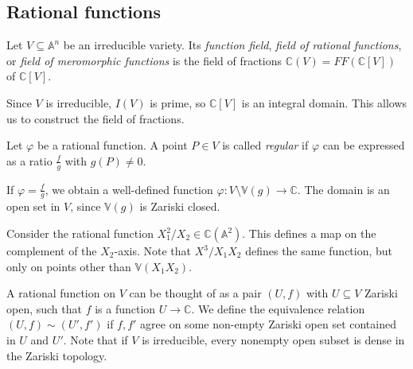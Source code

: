 \subsection{Rational functions}
\begin{definition}
    Let \( V \subseteq \mathbb A^n \) be an irreducible variety.
    Its \emph{function field}, \emph{field of rational functions}, or \emph{field of meromorphic functions} is the field of fractions \( \mathbb C(V) = FF(\mathbb C[V]) \) of \( \mathbb C[V] \).
\end{definition}
\begin{remark}
    Since \( V \) is irreducible, \( I(V) \) is prime, so \( \mathbb C[V] \) is an integral domain.
    This allows us to construct the field of fractions.
\end{remark}
\begin{definition}
    Let \( \varphi \) be a rational function.
    A point \( P \in V \) is called \emph{regular} if \( \varphi \) can be expressed as a ratio \( \frac{f}{g} \) with \( g(P) \neq 0 \).
\end{definition}
\begin{remark}
    If \( \varphi = \frac{f}{g} \), we obtain a well-defined function \( \varphi \colon V \setminus \mathbb V(g) \to \mathbb C \).
    The domain is an open set in \( V \), since \( \mathbb V(g) \) is Zariski closed.
\end{remark}
\begin{example}
    Consider the rational function \( X_1^2 / X_2 \in \mathbb C(\mathbb A^2) \).
    This defines a map on the complement of the \( X_2 \)-axis.
    Note that \( X^3 / X_1 X_2 \) defines the same function, but only on points other than \( \mathbb V(X_1 X_2) \).
\end{example}
\begin{remark}
    A rational function on \( V \) can be thought of as a pair \( (U, f) \) with \( U \subseteq V \) Zariski open, such that \( f \) is a function \( U \to \mathbb C \).
    We define the equivalence relation \( (U, f) \sim (U', f') \) if \( f, f' \) agree on some non-empty Zariski open set contained in \( U \) and \( U' \).
    Note that if \( V \) is irreducible, every nonempty open subset is dense in the Zariski topology.
\end{remark}
